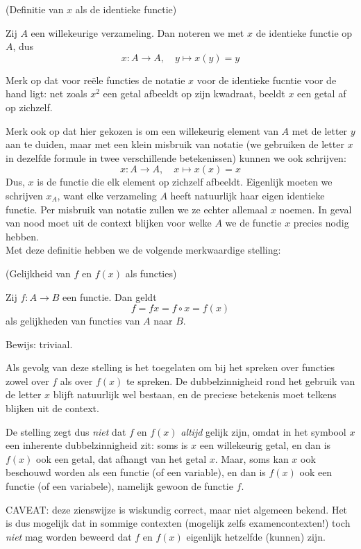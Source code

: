 \documentclass{ximera}
\begin{document}
\begin{uitweiding}
\begin{expandable}
\begin{definition} (Definitie van $x$ als de identieke functie)
    
    Zij $A$ een willekeurige verzameling. Dan noteren we met $x$ de identieke functie op $A$, dus
    $$
    x:A \to A,\quad y \mapsto x(y) = y
    $$
\end{definition}
Merk op dat voor reële functies de notatie $x$ voor de identieke fucntie voor de hand ligt: net zoals $x^2$ een getal afbeeldt op zijn kwadraat, beeldt $x$ een getal af op zichzelf.

Merk ook op dat hier gekozen is om een willekeurig element van $A$ met de letter $y$ aan te duiden, maar met een klein misbruik van notatie (we gebruiken de letter $x$ in dezelfde formule in twee verschillende betekenissen) kunnen we ook schrijven:
$$
    x:A \to A,\quad x \mapsto x(x) = x
$$
Dus, $x$ is de functie die elk element op zichzelf afbeeldt. Eigenlijk moeten we schrijven $x_A$, want elke verzameling $A$ heeft natuurlijk haar eigen identieke functie. Per misbruik van notatie zullen we ze echter allemaal $x$ noemen. In geval van nood moet uit de context blijken voor welke $A$ we de functie $x$ precies nodig hebben.
\\

Met deze definitie hebben we de volgende merkwaardige stelling:
\begin{proposition} (Gelijkheid van $f$ en $f(x)$ als functies)
    
    Zij $f:A\to B$ een functie. Dan geldt    
    $$
    f = fx = f\circ x = f(x)
    $$
    als gelijkheden van functies van $A$ naar $B$.
\end{proposition}
Bewijs: triviaal.

Als gevolg van deze stelling is het toegelaten om bij het spreken over functies zowel over $f$ als over $f(x)$ te spreken. De dubbelzinnigheid rond het gebruik van de letter $x$ blijft natuurlijk wel bestaan, en de preciese betekenis moet telkens blijken uit de context. 

De stelling zegt dus \textit{niet} dat $f$ en $f(x)$ \textit{altijd} gelijk zijn, omdat in het symbool $x$ een inherente dubbelzinnigheid zit: soms is $x$ een willekeurig getal, en dan is $f(x)$ ook een getal, dat afhangt van het getal $x$. Maar, soms kan $x$ ook beschouwd worden als een functie (of een variable), en dan is $f(x)$ ook een functie (of een variabele), namelijk gewoon de functie $f$.

CAVEAT: deze zienswijze is wiskundig correct, maar niet algemeen bekend. Het is dus mogelijk dat in sommige contexten (mogelijk zelfs examencontexten!) toch \textit{niet} mag worden beweerd dat $f$ en $f(x)$ eigenlijk hetzelfde (kunnen) zijn.

\end{expandable}

\end{uitweiding}
\end{document}
